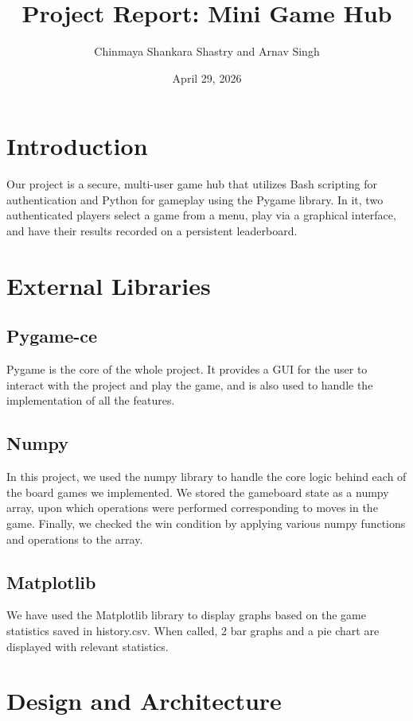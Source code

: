 \documentclass[12pt, letter]{article}
\title{Project Report:
Mini Game Hub}
\author{Chinmaya Shankara Shastry  and Arnav Singh }
\date{April 29, 2026}
\begin{document}
\maketitle
\newpage
\tableofcontents
\newpage

\section{Introduction}
Our project is a secure, multi-user game hub that utilizes Bash scripting for authentication and Python for gameplay using the Pygame library. In it, two authenticated players select a game from a menu, play via a graphical interface, and have their results recorded on a persistent leaderboard.

\section{External Libraries}

\subsection{Pygame-ce}
Pygame is the core of the whole project. It provides a GUI for the user to interact with the project and play the game, and is also used to handle the implementation of all the features. \cite{pygame}


\subsection{Numpy}
In this project, we used the numpy library to handle the core logic behind each of the board games we implemented. We stored the gameboard state as a numpy array, upon which operations were performed corresponding to moves in the game. Finally, we checked the win condition by applying various numpy functions and operations to the array. \cite{numpy}

\subsection{Matplotlib}
We have used the Matplotlib library to display graphs based on the game statistics saved in history.csv. When called, 2 bar graphs and a pie chart are displayed with relevant statistics. \cite{matplotlib}

\section{Design and Architecture}
\end{document}
